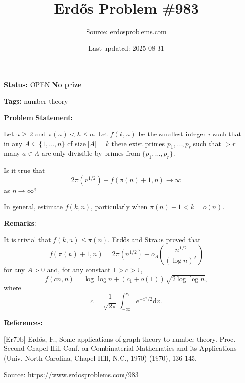 \documentclass{article}
\title{Erd\H{o}s Problem \#983}
\date{Last updated: 2025-08-31}
\author{Source: erdosproblems.com}
\begin{document}
\maketitle

\noindent\textbf{Status:} OPEN \quad \textbf{No prize}

\noindent\textbf{Tags:} number theory

\medskip
\noindent\textbf{Problem Statement:}

Let $n\geq 2$ and $\pi(n)<k\leq n$. Let $f(k,n)$ be the smallest integer $r$ such that in any $A\subseteq \{1,\ldots,n\}$ of size $\lvert A\rvert=k$ there exist primes $p_1,\ldots,p_r$ such that $>r$ many $a\in A$ are only divisible by primes from $\{p_1,\ldots,p_r\}$. 

Is it true that\[2\pi(n^{1/2})-f(\pi(n)+1,n)\to \infty\]as $n\to \infty$?

In general, estimate $f(k,n)$, particularly when $\pi(n)+1<k=o(n)$.

\bigskip
\noindent\textbf{Remarks:}

It is trivial that $f(k,n)\leq \pi(n)$. Erd\H{o}s and Straus \cite{Er70b} proved that\[f(\pi(n)+1,n)=2\pi(n^{1/2})+o_A\left(\frac{n^{1/2}}{(\log n)^A}\right)\]for any $A>0$ and, for any constant $1>c>0$,\[f(cn,n)=\log\log n+(c_1+o(1))\sqrt{2\log\log n},\]where\[c=\frac{1}{\sqrt{2\pi}}\int_{-\infty}^{c_1}e^{-x^2/2}\mathrm{d}x.\]

\bigskip
\noindent\textbf{References:}

[Er70b] Erd\H{o}s, P., Some applications of graph theory to number theory. Proc. Second Chapel Hill Conf. on Combinatorial Mathematics and its Applications (Univ. North Carolina, Chapel Hill, N.C., 1970) (1970), 136-145.

\bigskip
\noindent\small{Source: \url{https://www.erdosproblems.com/983}}
\end{document}
